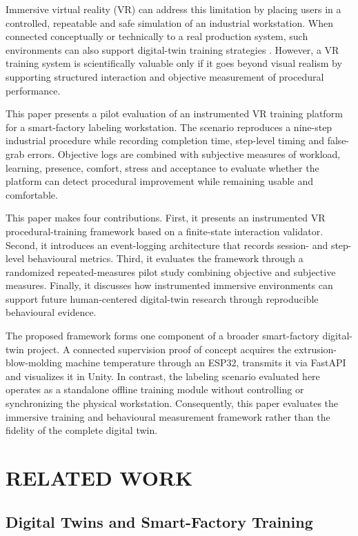 \documentclass[a4paper,twoside]{article}
\begin{document}
Immersive virtual reality (VR) can address this limitation by placing users in a controlled, repeatable and safe simulation of an industrial workstation. When connected conceptually or technically to a real production system, such environments can also support digital-twin training strategies \cite{Jones2020,Rasheed2020,Thelen2022}. However, a VR training system is scientifically valuable only if it goes beyond visual realism by supporting structured interaction and objective measurement of procedural performance.

This paper presents a pilot evaluation of an instrumented VR training platform for a smart-factory labeling workstation. The scenario reproduces a nine-step industrial procedure while recording completion time, step-level timing and false-grab errors. Objective logs are combined with subjective measures of workload, learning, presence, comfort, stress and acceptance to evaluate whether the platform can detect procedural improvement while remaining usable and comfortable.

This paper makes four contributions. First, it presents an instrumented VR procedural-training framework based on a finite-state interaction validator. Second, it introduces an event-logging architecture that records session- and step-level behavioural metrics. Third, it evaluates the framework through a randomized repeated-measures pilot study combining objective and subjective measures. Finally, it discusses how instrumented immersive environments can support future human-centered digital-twin research through reproducible behavioural evidence.

The proposed framework forms one component of a broader smart-factory digital-twin project. A connected supervision proof of concept acquires the extrusion-blow-molding machine temperature through an ESP32, transmits it via FastAPI and visualizes it in Unity. In contrast, the labeling scenario evaluated here operates as a standalone offline training module without controlling or synchronizing the physical workstation. Consequently, this paper evaluates the immersive training and behavioural measurement framework rather than the fidelity of the complete digital twin.

\section{\uppercase{Related Work}}
\label{sec:related}

\subsection{Digital Twins and Smart-Factory Training}
\end{document}
